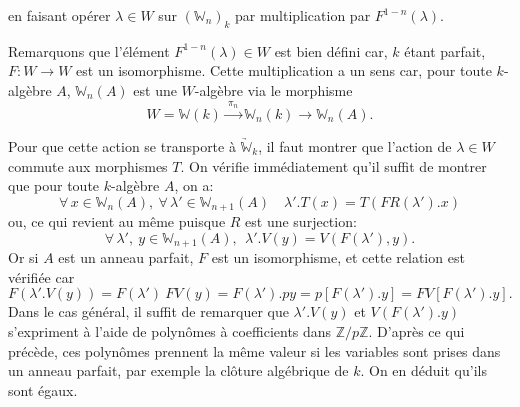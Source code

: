 en faisant opérer $\lambda \in W$ sur $(\mathbb{W}_n)_k$ par multiplication par $F^{1-n}(\lambda)$.

Remarquons que l'élément $F^{1-n}(\lambda) \in W$ est bien défini car,
$k$ étant parfait, $F\colon W \to W$ est un isomorphisme. Cette multiplication
a un sens car, pour toute $k$-algèbre $A$, $\mathbb{W}_n(A)$ est une $W$-algèbre via le
morphisme
\[ W = \mathbb{W}(k) \xrightarrow{\ \pi_n\ } \mathbb{W}_n(k) \to \mathbb{W}_n(A) . \]

Pour que cette action se transporte à $\underrightarrow{\mathbb{W}}_k$, il faut montrer que
l'action de $\lambda \in W$ commute aux morphismes $T$. On vérifie immédiatement
qu'il suffit de montrer que pour toute $k$-algèbre $A$, on a:
\[ \forall\, x \in \mathbb{W}_n(A) ,\ \forall\, \lambda' \in \mathbb{W}_{n+1}(A) \quad \lambda'.T(x) = T(FR(\lambda').x) \]
ou, ce qui revient au même puisque $R$ est une surjection:
\[ \forall\, \lambda' ,\ y \in \mathbb{W}_{n+1}(A) ,\ \ \lambda'.V(y) = V(F(\lambda'),y) . \]
Or si $A$ est un anneau parfait, $F$ est un isomorphisme, et cette relation
est vérifiée car
\[ F(\lambda'.V(y)) = F(\lambda')\ FV(y) = F(\lambda').py = p[F(\lambda').y] = FV[F(\lambda').y]. \]
Dans le cas général, il suffit de remarquer que $\lambda'.V(y)$ et $V(F(\lambda').y)$
s'expriment à l'aide de polynômes à coefficients dans $\mathbb{Z}/p\mathbb{Z}$. D'après
ce qui précède, ces polynômes prennent la même valeur si les variables
sont prises dans un anneau parfait, par exemple la clôture algébrique
de $k$. On en déduit qu'ils sont égaux.

